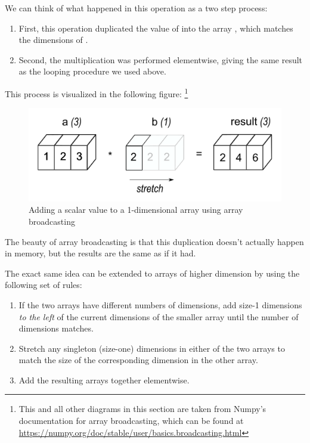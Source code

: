 We can think of what happened in this operation as a two step process:
\begin{enumerate}
	\item[1)] First, this operation duplicated the value of  into the array \li{[2, 2, 2]}, which matches the dimensions of . 
	\item[2)] Second, the multiplication  was performed elementwise, giving the same result as the looping procedure we used above.
\end{enumerate}
This process is visualized in the following figure:
\footnote{This and all other diagrams in this section are taken from Numpy's documentation for array broadcasting, which can be found at \url{https://numpy.org/doc/stable/user/basics.broadcasting.html}}
\begin{figure}[H]
    \includegraphics[width=.7\textwidth]{figures/broadcasting_scalar.png}
    \caption{Adding a scalar value to a 1-dimensional array using array broadcasting}
\end{figure}





The beauty of array broadcasting is that this duplication doesn't actually happen in memory, but the results are the same as if it had.

The exact same idea can be extended to arrays of higher dimension by using the following set of rules:

\begin{enumerate}
	\item[1)]  If the two arrays have different numbers of dimensions, add size-1 dimensions \emph{to the left} of the current dimensions of the smaller array until the number of dimensions matches.
	
	\item[2)] Stretch any singleton (size-one) dimensions in either of the two arrays to match the size of the corresponding dimension in the other array.
	
	\item[3)] Add the resulting arrays together elementwise.
\end{enumerate}

